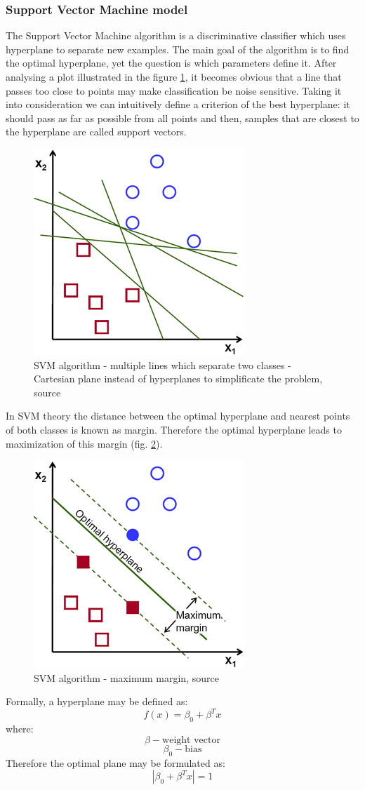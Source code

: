 	\subsubsection{Support Vector Machine model}
	The Support Vector Machine algorithm is a discriminative classifier which uses hyperplane to separate new examples. The main goal of the algorithm is to find the optimal hyperplane, yet the question is which parameters define it. After analysing a plot illustrated in the figure \ref{svm-plot}, it becomes obvious that a line that passes too close to points may make classification be noise sensitive.  Taking it into consideration we can intuitively define a criterion of the best hyperplane: it should pass as far as possible from all points and then, samples that are closest to the hyperplane are called support vectors.
		\begin{figure}[H]
	\begin{center}
	\includegraphics[width=0.4\linewidth]{images/svm-plot.png}
	\caption{SVM algorithm - multiple lines which separate two classes - Cartesian plane instead of hyperplanes to simplificate the problem, source \cite{svm-plot} }
	\label{svm-plot}
	\end{center}
	\end{figure}
	In SVM theory the distance between the optimal hyperplane and nearest points of both classes is known as margin. Therefore the optimal hyperplane leads to maximization of this margin (fig. \ref{svm-plot2}).
	\begin{figure}[H]
	\begin{center}
	\includegraphics[width=0.4\linewidth]{images/svm-plot2.png}
	\caption{SVM algorithm - maximum margin, source \cite{svm-plot} }
	\label{svm-plot2}
	\end{center}
	\end{figure}
	Formally, a hyperplane may be defined as:
	\[f(x)=\beta_0+\beta^Tx\]
where:
 \[\beta - \text{weight vector}\]  
 \[\beta_0 - \text{bias}\]  
 Therefore the optimal plane may be formulated as:
 \[\left | \beta_0+\beta^Tx \right | = 1\]

